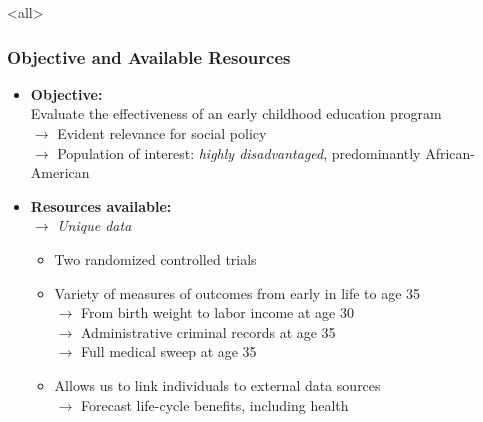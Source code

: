 \documentclass[static]{JJH-Beamer}
\begin{document}
\renewcommand*{\inserttotalframenumber}{\pageref{lastframe}}
\mode<all>{\theTitlePages} %



\begin{frame}
\frametitle{Objective and Available Resources}
\begin{itemize}
	\item \textbf{Objective:} \\ Evaluate the effectiveness of an early childhood education program \\
	$\rightarrow$ Evident relevance for social policy \\
	$\rightarrow$ Population of interest: \textit{highly disadvantaged}, predominantly African-American
	\item \textbf{Resources available:}\\
		$\rightarrow$ \textit{Unique data}
			\begin{itemize}
				\item Two randomized controlled trials
				\item Variety of measures of outcomes from early in life to age 35 \\
					$\rightarrow$ From birth weight to labor income at age 30 \\ 
					$\rightarrow$ Administrative criminal records at age 35 \\ 
					$\rightarrow$ Full medical sweep at age 35 
				\item Allows us to link individuals to external data sources \\
					$\rightarrow$ Forecast life-cycle benefits, including health
			\end{itemize}					
\end{itemize}
\end{frame}

\end{document}

